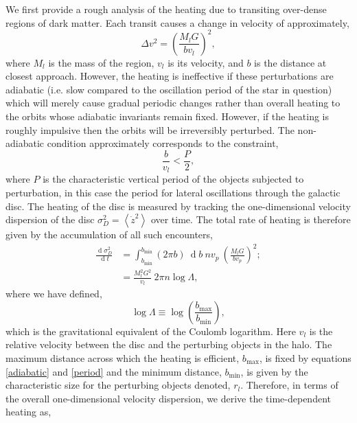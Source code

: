 \documentclass[usenatbib]{mnras}
\renewcommand{\d}[1]{\! \mathrm{d}#1 \:}
\newcommand{\deriv}[2]{\frac{\d{#1}}{\d{#2}}}
\renewcommand{\d}[1]{\ensuremath{\operatorname{d}\!{#1}}}
\begin{document}
We first provide a rough analysis of the heating due to transiting over-dense regions of dark matter. Each transit causes a change in velocity of approximately,
\begin{equation}
\Delta v^2 = \left( \frac{M_l G}{b v_l} \right)^2,
\end{equation}
where $M_l$ is the mass of the region, $v_l$ is its velocity, and $b$ is the distance at closest approach. However, the heating is ineffective if these perturbations are adiabatic (i.e. slow compared to the oscillation period of the star in question) which will merely cause gradual periodic changes rather than overall heating to the orbits whose adiabatic invariants remain fixed. However, if the heating is roughly impulsive then the orbits will be irreversibly perturbed. The non-adiabatic condition approximately corresponds to the constraint,
\begin{equation} \label{adiabatic}
\frac{b}{v_l} < \frac{P}{2},
\end{equation}
where $P$ is the characteristic vertical period of the objects subjected to perturbation, in this case the period for lateral oscillations through the galactic disc. The heating of the disc is measured by tracking the one-dimensional velocity dispersion of the disc $\sigma_D^2 = \left< \dot{z}^2 \right>$ over time. The total rate of heating is therefore given by the accumulation of all such encounters,
\begin{subequations}
\begin{align}
\deriv{\sigma_D^2}{t} &= \int_{b_{\min}}^{b_{\min}} (2 \pi b) \: \d{b} \: n v_p \: \left( \frac{M_l G}{b v_p} \right)^2 ;
\\
& = \frac{M_l^2 G^2}{v_l} \: 2 \pi n \log{\Lambda},
\end{align}
\end{subequations}
where we have defined,
\begin{equation}
\log{\Lambda} \equiv \log{\left( \frac{b_{\text{max}}}{b_{\text{min}}} \right)},
\end{equation}
which is the gravitational equivalent of the Coulomb logarithm. Here $v_l$ is the relative velocity between the disc and the perturbing objects in the halo. 
The maximum distance across which the heating is efficient, $b_{\max}$, is fixed by equations \eqref{adiabatic} and \eqref{period} and the minimum distance, $b_{\min}$, is given by the characteristic size for the perturbing objects denoted, $r_{l}$. 
Therefore, in terms of the overall one-dimensional velocity dispersion, we derive the time-dependent heating as,
\end{document}
